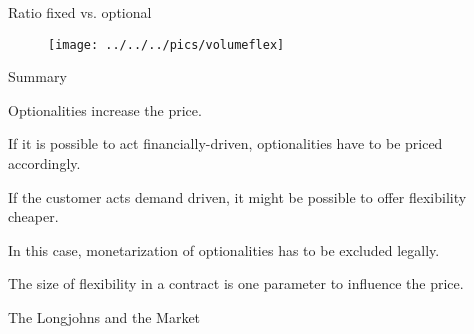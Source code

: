 


{Ratio fixed vs. optional}
\begin{figure}
	\centering
		\texttt{[image: ../../../pics/volumeflex]}
	\label{fig:volumeflex}
\end{figure}

{Summary}






	Optionalities increase the price.

	If it is possible to act financially-driven, optionalities have to be priced accordingly.

	If the customer acts demand driven, it might be possible to offer flexibility cheaper.

	In this case, monetarization of optionalities has to be excluded legally.

	The size of flexibility in a contract is one parameter to influence the price.






{The Longjohns and the Market}
